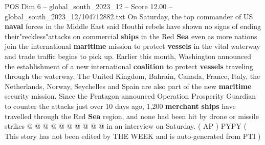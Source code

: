 \begin{textsample}{POS Dim 6 – global\_south\_2023\_12 – Score 12.00 – global\_south\_2023\_12/104712882.txt}
On Saturday, the top commander of US \textbf{naval} forces in the Middle East said Houthi rebels have shown no signs of ending their"reckless"attacks on commercial \textbf{ships} in the Red \textbf{Sea} even as more nations join the international \textbf{maritime} mission to protect \textbf{vessels} in the vital waterway and trade traffic begins to pick up.
Earlier this month, Washington announced the establishment of a new international \textbf{coalition} to protect \textbf{vessels} traveling through the waterway.
The United Kingdom, Bahrain, Canada, France, Italy, the Netherlands, Norway, Seychelles and Spain are also part of the new \textbf{maritime} security mission.
Since the Pentagon announced Operation Prosperity Guardian to counter the attacks just over 10 days ago, 1,200 \textbf{merchant} \textbf{ships} have travelled through the Red \textbf{Sea} region, and none had been hit by drone or missile strikes @ @ @ @ @ @ @ @ @ @ in an interview on Saturday. ( AP ) PYPY ( This story has not been edited by THE WEEK and is auto-generated from PTI )

\end{textsample}

